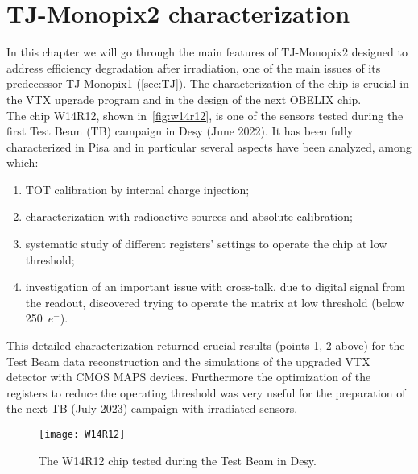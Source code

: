 
\chapter{TJ-Monopix2 characterization} \label{ch:TJ2}

In this chapter we will go through the main features of TJ-Monopix2 designed to address efficiency degradation after irradiation, one of the main issues of its predecessor TJ-Monopix1 (\autoref{sec:TJ}). The characterization of the chip is crucial in the VTX upgrade program and in the design of the next OBELIX chip.\\
The chip W14R12, shown in~\autoref{fig:w14r12}, is one of the sensors tested during the first Test Beam (TB) campaign in Desy (June 2022). It has been fully characterized in Pisa and in particular several aspects have been analyzed, among which:

\begin{enumerate}
\item TOT calibration by internal charge injection;
\item characterization with radioactive sources and absolute calibration;
\item systematic study of different registers' settings to operate the chip at low threshold;
\item investigation of an important issue with cross-talk, due to digital signal from the readout, discovered trying to operate the matrix at low threshold (below 250~$e^{-}$).
\end{enumerate}

This detailed characterization returned crucial results (points 1, 2 above) for the Test Beam data reconstruction and the simulations of the upgraded VTX detector with CMOS MAPS devices. Furthermore the optimization of the registers to reduce the operating threshold was very useful for the preparation of the next TB (July 2023) campaign with irradiated sensors.


\begin{figure}[h!]
\centering
\texttt{[image: W14R12]}
\caption{The W14R12 chip tested during the Test Beam in Desy.}
\label{fig:w14r12}
\end{figure}



